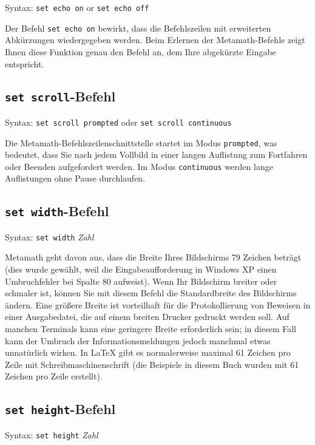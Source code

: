 Syntax:  \texttt{set echo on} or \texttt{set echo off}

Der Befehl \texttt{set echo on} bewirkt, dass die Befehlszeilen mit erweiterten Abkürzungen wiedergegeben werden.  Beim Erlernen der Metamath-Befehle zeigt Ihnen diese Funktion genau den Befehl an, dem Ihre abgekürzte Eingabe entspricht.


\subsection{\texttt{set scroll}-Befehl}

Syntax:  \texttt{set scroll prompted} oder \texttt{set scroll continuous}

Die Metamath-Befehlszeilenschnittstelle startet im Modus \texttt{prompted}, was bedeutet, dass Sie nach jedem Vollbild in einer langen Auflistung zum Fortfahren oder Beenden aufgefordert werden.  Im Modus \texttt{continuous} werden lange Auflistungen ohne Pause durchlaufen.


\subsection{\texttt{set width}-Befehl}

Syntax:  \texttt{set width} {\em Zahl}

Metamath geht davon aus, dass die Breite Ihres Bildschirms 79 Zeichen beträgt (dies wurde gewählt, weil die Eingabeaufforderung in Windows XP einen Umbruchfehler bei Spalte 80 aufweist).  Wenn Ihr Bildschirm breiter oder schmaler ist, können Sie mit diesem Befehl die Standardbreite des Bildschirms ändern.  Eine größere Breite ist vorteilhaft für die Protokollierung von Beweisen in einer Ausgabedatei, die auf einem breiten Drucker gedruckt werden soll.  Auf manchen Terminals kann eine geringere Breite erforderlich sein; in diesem Fall kann der Umbruch der Informationsmeldungen jedoch manchmal etwas unnatürlich wirken.  In \LaTeX{} gibt es normalerweise maximal 61 Zeichen pro Zeile mit Schreibmaschinenschrift (die Beispiele in diesem Buch wurden mit 61 Zeichen pro Zeile erstellt).


\subsection{\texttt{set height}-Befehl}

Syntax:  \texttt{set height} {\em Zahl}

